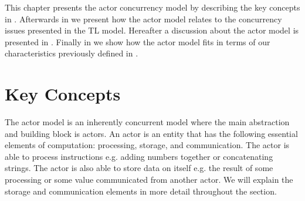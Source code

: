 \makeatletter {}\makeatother
{}
This chapter presents the actor concurrency model by describing the key concepts in . Afterwards in  we present how the actor model relates to the concurrency issues presented in the \ac{TL} model. Hereafter a discussion about the actor model is presented in . Finally in  we show how the actor model fits in terms of our characteristics previously defined in .

\section{Key Concepts}\label{sec:actor_concepts}
The actor model is an inherently concurrent model where the main abstraction and building block is actors\cite[p. 2]{karmani2009actor}. An actor is an entity that has the following essential elements of computation\cite{actorLangNextVideo}: processing, storage, and communication. The actor is able to process instructions e.g. adding numbers together or concatenating strings. The actor is also able to store data on itself e.g. the result of some processing or some value communicated from another actor. We will explain the storage and communication elements in more detail throughout the section.


